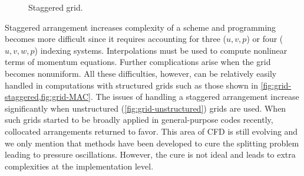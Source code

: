 \documentclass{article}
\numberwithin{equation}{section}
\begin{document}
\begin{figure}[H]
\centering
\caption{\small Staggered grid.}
\end{figure}


Staggered arrangement increases complexity of a scheme and programming becomes more difficult since it requires accounting for three ($u,v,p$) or four ($u,v,w,p$) indexing systems. 
Interpolations must be used to compute nonlinear terms of momentum equations. 
Further complications arise when the grid becomes nonuniform. 
All these difficulties, however, can be relatively easily handled in computations with structured grids such as those shown in \cref{fig:grid-staggered,fig:grid-MAC}. 
The issues of handling a staggered arrangement increase significantly when unstructured (\cref{fig:grid-unstructured}) grids are used. 
When such grids started to be broadly applied in general-purpose codes recently, collocated arrangements returned to favor. 
This area of CFD is still evolving and we only mention that methods have been developed to cure the splitting problem leading to pressure oscillations. 
However, the cure is not ideal and leads to extra complexities at the implementation level.
\end{document}
